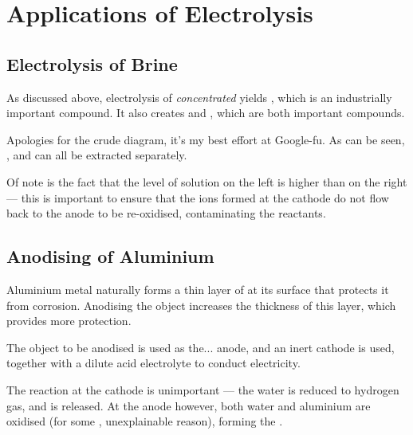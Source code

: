 




	\pagebreak
	\section{Applications of Electrolysis}

		\subsection{Electrolysis of Brine}

			As discussed above, electrolysis of \textit{concentrated}  yields , which is an industrially
			important compound. It also creates  and , which are both important compounds.


			Apologies for the crude diagram, it's my best effort at Google-fu. As can be seen, ,  and
			 can all be extracted separately.

			Of note is the fact that the level of solution on the left is higher than on the right --- this is important to ensure that
			the  ions formed at the cathode do not flow back to the anode to be re-oxidised, contaminating the reactants.




		\subsection{Anodising of Aluminium}

			Aluminium metal naturally forms a thin layer of  at its surface that protects it from corrosion. Anodising the object
			increases the thickness of this layer, which provides more protection.

			The object to be anodised is used as the... anode, and an inert cathode is used, together with a dilute acid electrolyte to conduct
			electricity.

			The reaction at the cathode is unimportant --- the water is reduced to hydrogen gas, and is released. At the anode however,
			both water and aluminium are oxidised (for some , unexplainable reason), forming the .

